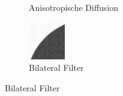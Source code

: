 \documentclass[conference]{IEEEtran}
\begin{document}
\begin{figure}
\begin{subfigure}[b]{0.4\textwidth}
    \caption{Anisotropische Diffusion}
    \label{fig:3}
  \end{subfigure}
  \begin{subfigure}[b]{0.4\textwidth}
    \includegraphics[width=\linewidth]{img/cut/bilateral_filtered.png}
    \caption{Bilateral Filter}
    \label{fig:4}
  \end{subfigure}
\end{figure}




\end{document}
